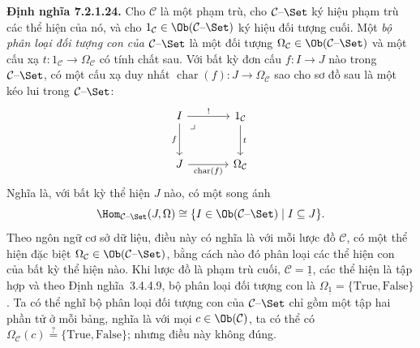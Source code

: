\noindent\textbf{Định nghĩa 7.2.1.24.}\keepwithnext
Cho $\mathcal C$ là một phạm trù, cho $\mathcal C\text{--}\Set$ ký hiệu phạm trù các thể hiện của nó, và cho $1_{\mathcal C}\in\Ob(\mathcal C\text{--}\Set)$ ký hiệu đối tượng cuối. Một \emph{bộ phân loại đối tượng con của $\mathcal C\text{--}\Set$} là một đối tượng $\Omega_{\mathcal C}\in\Ob(\mathcal C\text{--}\Set)$ và một cấu xạ $t:1_{\mathcal C}\to\Omega_{\mathcal C}$ có tính chất sau. Với bất kỳ đơn cấu $f:I\to J$ nào trong $\mathcal C\text{--}\Set$, có một cấu xạ duy nhất $\operatorname{char}(f):J\to\Omega_{\mathcal C}$ sao cho sơ đồ sau là một kéo lui trong $\mathcal C\text{--}\Set$:
\[
\begin{tikzcd}[column sep=large,row sep=large]
I\arrow[r,"!"]\arrow[d,"f"']\arrow[dr,phantom,"\lrcorner",very near start]&1_{\mathcal C}\arrow[d,"t"]\\
J\arrow[r,"\operatorname{char}(f)"']&\Omega_{\mathcal C}
\end{tikzcd}
\]
Nghĩa là, với bất kỳ thể hiện $J$ nào, có một song ánh
\[
\Hom_{\mathcal C\text{--}\Set}(J,\Omega)\cong\{I\in\Ob(\mathcal C\text{--}\Set)\mid I\subseteq J\}.
\]
Theo ngôn ngữ cơ sở dữ liệu, điều này có nghĩa là với mỗi lược đồ $\mathcal C$, có một thể hiện đặc biệt $\Omega_{\mathcal C}\in\Ob(\mathcal C\text{--}\Set)$, bằng cách nào đó phân loại các thể hiện con của bất kỳ thể hiện nào. Khi lược đồ là phạm trù cuối, $\mathcal C=\underline1$, các thể hiện là tập hợp và theo Định nghĩa~3.4.4.9, bộ phân loại đối tượng con là $\Omega_{\underline1}=\{\mathrm{True},\mathrm{False}\}$. Ta có thể nghĩ bộ phân loại đối tượng con của $\mathcal C\text{--}\Set$ chỉ gồm một tập hai phần tử ở mỗi bảng, nghĩa là với mọi $c\in\Ob(\mathcal C)$, ta có thể có $\Omega_{\mathcal C}(c)\overset{?}{=}\{\mathrm{True},\mathrm{False}\}$; nhưng điều này không đúng.

